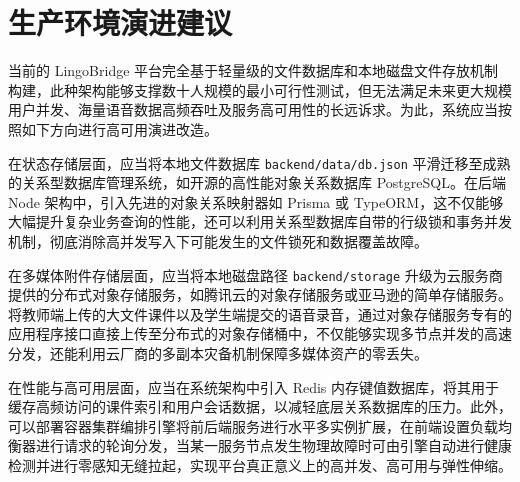 \section{生产环境演进建议}

当前的 LingoBridge 平台完全基于轻量级的文件数据库和本地磁盘文件存放机制构建，此种架构能够支撑数十人规模的最小可行性测试，但无法满足未来更大规模用户并发、海量语音数据高频吞吐及服务高可用性的长远诉求。为此，系统应当按照如下方向进行高可用演进改造。

在状态存储层面，应当将本地文件数据库 \texttt{backend/data/db.json} 平滑迁移至成熟的关系型数据库管理系统，如开源的高性能对象关系数据库 PostgreSQL。在后端 Node 架构中，引入先进的对象关系映射器如 Prisma 或 TypeORM，这不仅能够大幅提升复杂业务查询的性能，还可以利用关系型数据库自带的行级锁和事务并发机制，彻底消除高并发写入下可能发生的文件锁死和数据覆盖故障。

在多媒体附件存储层面，应当将本地磁盘路径 \texttt{backend/storage} 升级为云服务商提供的分布式对象存储服务，如腾讯云的对象存储服务或亚马逊的简单存储服务。将教师端上传的大文件课件以及学生端提交的语音录音，通过对象存储服务专有的应用程序接口直接上传至分布式的对象存储桶中，不仅能够实现多节点并发的高速分发，还能利用云厂商的多副本灾备机制保障多媒体资产的零丢失。

在性能与高可用层面，应当在系统架构中引入 Redis 内存键值数据库，将其用于缓存高频访问的课件索引和用户会话数据，以减轻底层关系数据库的压力。此外，可以部署容器集群编排引擎将前后端服务进行水平多实例扩展，在前端设置负载均衡器进行请求的轮询分发，当某一服务节点发生物理故障时可由引擎自动进行健康检测并进行零感知无缝拉起，实现平台真正意义上的高并发、高可用与弹性伸缩。
